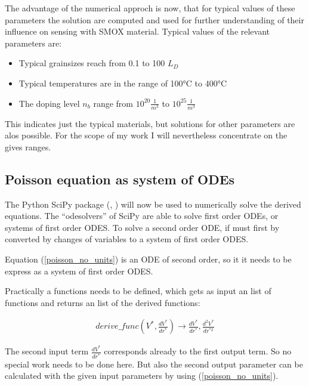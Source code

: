 \documentclass[11pt]{article}
\providecommand{\tightlist}{%
      \setlength{\itemsep}{0pt}\setlength{\parskip}{0pt}}
\begin{document}
The advantage of the numerical approch is now, that for typical values
of these parameters the solution are computed and used for further
understanding of their influence on sensing with SMOX material. Typical
values of the relevant parameters are:

\begin{itemize}
\tightlist
\item
  Typical grainsizes reach from 0.1 to 100 \(L_D\)
\item
  Typical temperatures are in the range of 100°C to 400°C
\item
  The doping level \(n_b\) range from \(10^{20}\frac{1}{m^3}\) to
  \(10^{25}\frac{1}{m^3}\)
\end{itemize}

This indicates just the typical materials, but solutions for other
parameters are alos possible. For the scope of my work I will
nevertheless concentrate on the gives ranges.

\hypertarget{poisson-equation-as-system-of-odes}{%
\subsection{Poisson equation as system of
ODEs}\label{poisson-equation-as-system-of-odes}}

The Python SciPy package (\cite{Jones}, \cite{Virtanen2020} ) will now
be used to numerically solve the derived equations. The ``odesolvers''
of SciPy are able to solve first order ODEs, or systems of first order
ODES. To solve a second order ODE, if must first by converted by changes
of variables to a system of first order ODES.

Equation (\ref{poisson_no_units}) is an ODE of second order, so it it
needs to be express as a system of first order ODES.

Practically a functions needs to be defined, which gets as input an list
of functions and returns an list of the derived functions:

\begin{align}
derive\_func\left(V^{*},\frac{dV^{*}}{dr^{*}}\right)\longrightarrow\frac{dV^{*}}{dr^{*}},\frac{d^2V^{*}}{dr^{*2}}
\end{align}

The second input term \(\frac{dV^{*}}{dr^{*}}\) corresponds already to
the first output term. So no special work needs to be done here. But
also the second output parameter can be calculated with the given input
parameters by using (\ref{poisson_no_units}).
\end{document}
